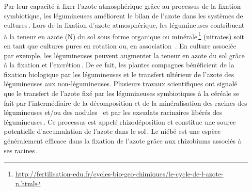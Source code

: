 \documentclass[a4paper,11pt]{article}
\begin{document}
Par leur capacité à fixer l’azote atmosphérique grâce au processus de
la fixation symbiotique, les légumineuses améliorent le bilan de
l'azote dans les systèmes de
cultures\,\cite{Ndakidemi_2005,Fustec11}. Lors de la fixation d’azote
atmosphérique, les légumineuses contribuent à la teneur en azote (N)
du sol sous forme organique ou
minérale\,\footnote{\url{http://fertilisation-edu.fr/cycles-bio-geo-chimiques/le-cycle-de-l-azote-n.html}}
(nitrates) soit en tant que cultures pures en rotation ou, en
association \,\cite{Bado_2006,Chu_2004,Makoi_2009,Ndakidemi_2005}. En
culture associée par exemple, les légumineuses peuvent augmenter la
teneur en azote du sol grâce à la fixation et
l’excrétion\,\cite{Trenbath_1976,Fustec11}. De ce fait, les plantes
compagnes bénéficient de la fixation biologique par les légumineuses
et le transfert ultérieur de l’azote des légumineuses aux
non-légumineuses. Plusieurs travaux scientifiques ont signalé que le
transfert de l’azote fixé par les légumineuses symbiotiques à la
céréale se fait par l’intermédiaire de la décomposition et de la
minéralisation des racines des légumineuses et/ou des nodules
\,\cite{Burity_1989} et par les exsudats racinaires libérés des
légumineuses\,\cite{Ndakidemi_2005,Makoi_2009}. Ce processus est
appelé rhizodéposition\cite{Fustec11} et constitue une source
potentielle d’accumulation de l’azote dans le
sol\,\cite{Koulibi_FideleZONGO}. Le niébé est une espèce généralement
efficace dans la fixation de l’azote grâce aux rhizobiums associés à
ses racines\,\cite{TRAORE_2009}.

\newpage

 
  
\end{document}
